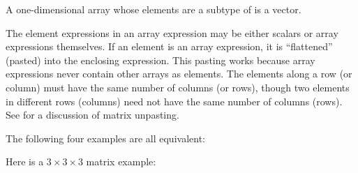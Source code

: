 A one-dimensional array whose elements are a subtype of 
is a vector.

The element expressions in an array expression may be either scalars or
array expressions themselves.  If an element is an array expression,
it is ``flattened'' (pasted) into the enclosing expression.
This pasting works because array expressions never
contain other arrays as elements.  The elements along
a row (or column) must have the same number of columns (or rows),
though two elements in different rows (columns) need not have the
same number of columns (rows).
See  for a discussion of matrix unpasting.



The following four examples are all equivalent:




Here is a $3\times3\times3$ matrix example:

